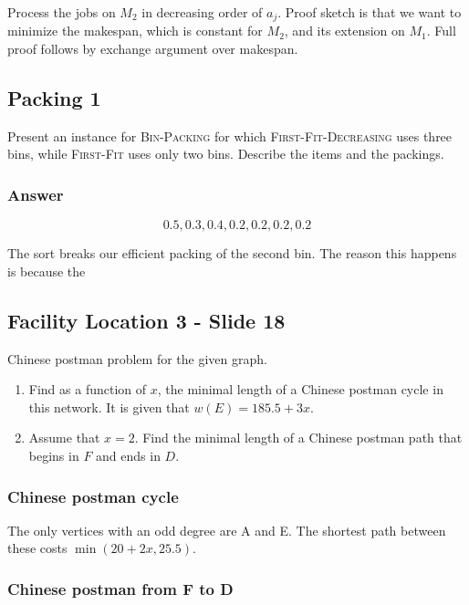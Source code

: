 \documentclass{idc_msc}
\begin{document}
Process the jobs on \(M_2\) in decreasing order of \(a_j\).
Proof sketch is that we want to minimize the makespan, which is constant for \(M_2\), and its extension on \(M_1\).
Full proof follows by exchange argument over makespan.

\subsection{Packing 1}

Present an instance for \textsc{Bin-Packing} for which \textsc{First-Fit-Decreasing} uses three bins, while \textsc{First-Fit} uses only two bins.
Describe the items and the packings.

\subsubsection{Answer}

\[0.5, 0.3, 0.4, 0.2, 0.2, 0.2, 0.2\]

The sort breaks our efficient packing of the second bin.
The reason this happens is because the 

\subsection{Facility Location 3 - Slide 18}

Chinese postman problem for the given graph.

\begin{enumerate}
  \item Find as a function of \(x\), the minimal length of a Chinese postman cycle in this network. It is given that \(w(E) = 185.5 + 3x\).
  \item Assume that \(x=2\). Find the minimal length of a Chinese postman path that begins in \(F\) and ends in \(D\).
\end{enumerate}

\subsubsection{Chinese postman cycle}

The only vertices with an odd degree are A and E.
The shortest path between these costs \(\min(20 + 2x, 25.5)\).

\subsubsection{Chinese postman from F to D}
\end{document}
